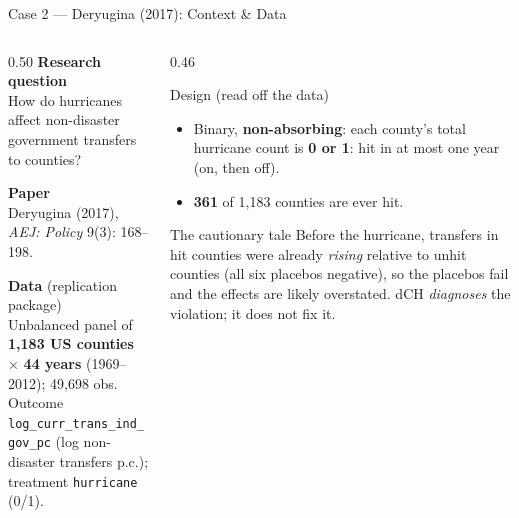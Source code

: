 \documentclass[main.tex]{subfiles}
\begin{document}
\recapdch


\begin{frame}{Case 2 --- Deryugina (2017): Context \& Data}

  \begin{columns}[T]
    \begin{column}{0.50\textwidth}
      \textbf{Research question}\\
      How do hurricanes affect non-disaster government transfers to
      counties?

      \medskip
      \textbf{Paper}\\
      Deryugina (2017), \textit{AEJ: Policy} 9(3): 168--198.

      \medskip
      \textbf{Data} (replication package)\\
      Unbalanced panel of \textbf{1{,}183 US counties}
      $\times$ \textbf{44 years} (1969--2012); 49{,}698 obs.\\[3pt]
      Outcome \texttt{log\_curr\_trans\_ind\_gov\_pc} (log non-disaster
      transfers p.c.); treatment \texttt{hurricane} (0/1).
    \end{column}
    \begin{column}{0.46\textwidth}
      \begin{block}{Design (read off the data)}
        \footnotesize
        \begin{itemize}\footnotesize
          \item Binary, \textbf{non-absorbing}: each county's total
            hurricane count is \textbf{0 or 1}: hit in at most one
            year (on, then off).
          \item \textbf{361} of 1{,}183 counties are ever hit.
        \end{itemize}
      \end{block}

      \smallskip
      \begin{alertblock}{\footnotesize The cautionary tale}
        \footnotesize
        Before the hurricane, transfers in hit counties were already
        \emph{rising} relative to unhit counties (all six placebos negative),
        so the placebos fail and the effects are likely overstated. dCH
        \emph{diagnoses} the violation; it does not fix it.
      \end{alertblock}
    \end{column}
  \end{columns}

\end{frame}
\end{document}
